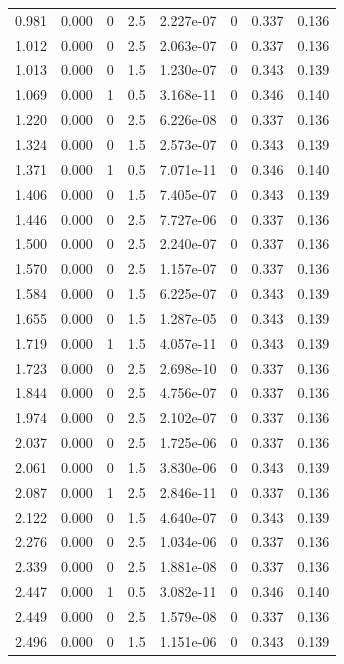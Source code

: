 \documentclass[preview]{standalone}
\begin{document}
{{\begin{tabular}{L{1.2cm}C{1.2cm} C{0.3cm}C{0.5cm} C{1.4cm}C{1.4cm} C{1.4cm}C{1.4cm}}
  0.981  &  0.000  & 0     & 2.5 &  2.227e-07  & 0  & 0.337 &  0.136   \\ 
  1.012  &  0.000  & 0     & 2.5 &  2.063e-07  & 0  & 0.337 &  0.136   \\ 
  1.013  &  0.000  & 0     & 1.5 &  1.230e-07  & 0  & 0.343 &  0.139   \\ 
  1.069  &  0.000  & 1     & 0.5 &  3.168e-11  & 0  & 0.346 &  0.140   \\ 
  1.220  &  0.000  & 0     & 2.5 &  6.226e-08  & 0  & 0.337 &  0.136   \\ 
  1.324  &  0.000  & 0     & 1.5 &  2.573e-07  & 0  & 0.343 &  0.139   \\ 
  1.371  &  0.000  & 1     & 0.5 &  7.071e-11  & 0  & 0.346 &  0.140   \\ 
  1.406  &  0.000  & 0     & 1.5 &  7.405e-07  & 0  & 0.343 &  0.139   \\ 
  1.446  &  0.000  & 0     & 2.5 &  7.727e-06  & 0  & 0.337 &  0.136   \\ 
  1.500  &  0.000  & 0     & 2.5 &  2.240e-07  & 0  & 0.337 &  0.136   \\ 
  1.570  &  0.000  & 0     & 2.5 &  1.157e-07  & 0  & 0.337 &  0.136   \\ 
  1.584  &  0.000  & 0     & 1.5 &  6.225e-07  & 0  & 0.343 &  0.139   \\ 
  1.655  &  0.000  & 0     & 1.5 &  1.287e-05  & 0  & 0.343 &  0.139   \\ 
  1.719  &  0.000  & 1     & 1.5 &  4.057e-11  & 0  & 0.343 &  0.139   \\ 
  1.723  &  0.000  & 0     & 2.5 &  2.698e-10  & 0  & 0.337 &  0.136   \\ 
  1.844  &  0.000  & 0     & 2.5 &  4.756e-07  & 0  & 0.337 &  0.136   \\ 
  1.974  &  0.000  & 0     & 2.5 &  2.102e-07  & 0  & 0.337 &  0.136   \\ 
  2.037  &  0.000  & 0     & 2.5 &  1.725e-06  & 0  & 0.337 &  0.136   \\ 
  2.061  &  0.000  & 0     & 1.5 &  3.830e-06  & 0  & 0.343 &  0.139   \\ 
  2.087  &  0.000  & 1     & 2.5 &  2.846e-11  & 0  & 0.337 &  0.136   \\ 
  2.122  &  0.000  & 0     & 1.5 &  4.640e-07  & 0  & 0.343 &  0.139   \\ 
  2.276  &  0.000  & 0     & 2.5 &  1.034e-06  & 0  & 0.337 &  0.136   \\ 
  2.339  &  0.000  & 0     & 2.5 &  1.881e-08  & 0  & 0.337 &  0.136   \\ 
  2.447  &  0.000  & 1     & 0.5 &  3.082e-11  & 0  & 0.346 &  0.140   \\ 
  2.449  &  0.000  & 0     & 2.5 &  1.579e-08  & 0  & 0.337 &  0.136   \\ 
  2.496  &  0.000  & 0     & 1.5 &  1.151e-06  & 0  & 0.343 &  0.139   \\ 
\hline 
\end{tabular} 

}}
\end{document}

